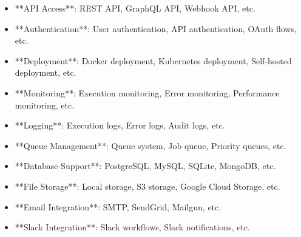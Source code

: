 \documentclass[11pt,a4paper]{article}
\begin{document}
\begin{itemize}
\item **API Access**: REST API, GraphQL API, Webhook API, etc.
\end{itemize}

\begin{itemize}
\item **Authentication**: User authentication, API authentication, OAuth flows, etc.
\end{itemize}

\begin{itemize}
\item **Deployment**: Docker deployment, Kubernetes deployment, Self-hosted deployment, etc.
\end{itemize}

\begin{itemize}
\item **Monitoring**: Execution monitoring, Error monitoring, Performance monitoring, etc.
\end{itemize}

\begin{itemize}
\item **Logging**: Execution logs, Error logs, Audit logs, etc.
\end{itemize}

\begin{itemize}
\item **Queue Management**: Queue system, Job queue, Priority queues, etc.
\end{itemize}

\begin{itemize}
\item **Database Support**: PostgreSQL, MySQL, SQLite, MongoDB, etc.
\end{itemize}

\begin{itemize}
\item **File Storage**: Local storage, S3 storage, Google Cloud Storage, etc.
\end{itemize}

\begin{itemize}
\item **Email Integration**: SMTP, SendGrid, Mailgun, etc.
\end{itemize}

\begin{itemize}
\item **Slack Integration**: Slack workflows, Slack notifications, etc.
\end{itemize}
\end{document}
